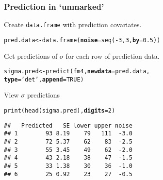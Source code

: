 \documentclass[color=usenames,dvipsnames]{beamer}\usepackage[]{graphicx}\usepackage[]{xcolor}
\makeatletter
\newcommand{\hlnum}[1]{\textcolor[rgb]{0.69,0.494,0}{#1}}%
\newcommand{\hlsng}[1]{\textcolor[rgb]{0.749,0.012,0.012}{#1}}%
\newcommand{\hlopt}[1]{\textcolor[rgb]{0,0,0}{#1}}%
\newcommand{\hldef}[1]{\textcolor[rgb]{0,0,0}{#1}}%
\newcommand{\hlkwb}[1]{\textcolor[rgb]{0,0.341,0.682}{#1}}%
\newcommand{\hlkwc}[1]{\textcolor[rgb]{0,0,0}{\textbf{#1}}}%
\newcommand{\hlkwd}[1]{\textcolor[rgb]{0.004,0.004,0.506}{#1}}%
\newenvironment{kframe}{%
 \def\at@end@of@kframe{}%
 \ifinner\ifhmode%
  \def\at@end@of@kframe{\end{minipage}}%
  \begin{minipage}{\columnwidth}%
 \fi\fi%
 \def\FrameCommand##1{\hskip\@totalleftmargin \hskip-\fboxsep
 \colorbox{shadecolor}{##1}\hskip-\fboxsep
     \hskip-\linewidth \hskip-\@totalleftmargin \hskip\columnwidth}%
 \MakeFramed {\advance\hsize-\width
   \@totalleftmargin\z@ \linewidth\hsize
   \@setminipage}}%
 {\par\unskip\endMakeFramed%
 \at@end@of@kframe}
\newenvironment{knitrout}{}{} %
\makeatother
\begin{document}
\begin{frame}[fragile]
  \frametitle{Prediction in `unmarked'}
  \small
  Create \texttt{data.frame} with prediction covariates. 
  \vspace{-6pt}
\begin{knitrout}\footnotesize
{}\color{fgcolor}\begin{kframe}
\begin{alltt}
\hldef{pred.data} \hlkwb{<-} \hlkwd{data.frame}\hldef{(}\hlkwc{noise}\hldef{=}\hlkwd{seq}\hldef{(}\hlopt{-}\hlnum{3}\hldef{,} \hlnum{3}\hldef{,} \hlkwc{by}\hldef{=}\hlnum{0.5}\hldef{))}
\end{alltt}
\end{kframe}
\end{knitrout}
\pause
\vfill
Get predictions of $\sigma$ for each row of prediction data.
  \vspace{-6pt}
\begin{knitrout}\footnotesize
{}\color{fgcolor}\begin{kframe}
\begin{alltt}
\hldef{sigma.pred} \hlkwb{<-} \hlkwd{predict}\hldef{(fm4,} \hlkwc{newdata}\hldef{=pred.data,}
                      \hlkwc{type}\hldef{=}\hlsng{'det'}\hldef{,} \hlkwc{append}\hldef{=}\hlnum{TRUE}\hldef{)}
\end{alltt}
\end{kframe}
\end{knitrout}
\pause
\vfill
  View $\sigma$ predictions
  \vspace{-6pt}
\begin{knitrout}\footnotesize
{}\color{fgcolor}\begin{kframe}
\begin{alltt}
\hlkwd{print}\hldef{(}\hlkwd{head}\hldef{(sigma.pred),} \hlkwc{digits}\hldef{=}\hlnum{2}\hldef{)}
\end{alltt}
\begin{verbatim}
##   Predicted   SE lower upper noise
## 1        93 8.19    79   111  -3.0
## 2        72 5.37    62    83  -2.5
## 3        55 3.45    49    62  -2.0
## 4        43 2.18    38    47  -1.5
## 5        33 1.38    30    36  -1.0
## 6        25 0.92    23    27  -0.5
\end{verbatim}
\end{kframe}
\end{knitrout}
\end{frame}
\end{document}
